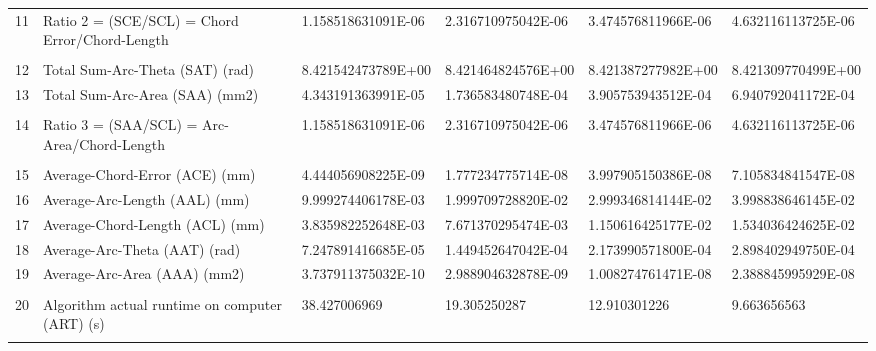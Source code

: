 \begin{landscape}
\begin{table}[ht]
{\begin{tabular}{ p{0.2cm} p{8.80cm} p{4.00cm} p{4.0cm} p{4.00cm} p{4.0cm}}
	11	&	Ratio 2 = (SCE/SCL) = Chord Error/Chord-Length	&	1.158518631091E-06	&	2.316710975042E-06	&	3.474576811966E-06	&	4.632116113725E-06	\\
	&		&		&		&		&		\\
	12	&	Total Sum-Arc-Theta (SAT) (rad)	&	8.421542473789E+00	&	8.421464824576E+00	&	8.421387277982E+00	&	8.421309770499E+00	\\
	13	&	Total Sum-Arc-Area (SAA) (mm2)	&	4.343191363991E-05	&	1.736583480748E-04	&	3.905753943512E-04	&	6.940792041172E-04	\\
	&		&		&		&		&		\\
	14	&	Ratio 3 = (SAA/SCL) = Arc-Area/Chord-Length	&	1.158518631091E-06	&	2.316710975042E-06	&	3.474576811966E-06	&	4.632116113725E-06	\\
	&		&		&		&		&		\\
	15	&	Average-Chord-Error (ACE) (mm)	&	4.444056908225E-09	&	1.777234775714E-08	&	3.997905150386E-08	&	7.105834841547E-08	\\
	16	&	Average-Arc-Length (AAL) (mm)	&	9.999274406178E-03	&	1.999709728820E-02	&	2.999346814144E-02	&	3.998838646145E-02	\\
	17	&	Average-Chord-Length (ACL) (mm)	&	3.835982252648E-03	&	7.671370295474E-03	&	1.150616425177E-02	&	1.534036424625E-02	\\
	18	&	Average-Arc-Theta (AAT) (rad)	&	7.247891416685E-05	&	1.449452647042E-04	&	2.173990571800E-04	&	2.898402949750E-04	\\
	19	&	Average-Arc-Area (AAA) (mm2)	&	3.737911375032E-10	&	2.988904632878E-09	&	1.008274761471E-08	&	2.388845995929E-08	\\
	&		&		&		&		&		\\
	20	&	Algorithm actual runtime on computer (ART) (s) 	&	38.427006969	&	19.305250287	&	12.910301226	&	9.663656563	\\
	&		&		&		&		&	\\	
	\hline		
\end{tabular}

			
}   %
		
\end{table}
\end{landscape}

\clearpage
\pagebreak
